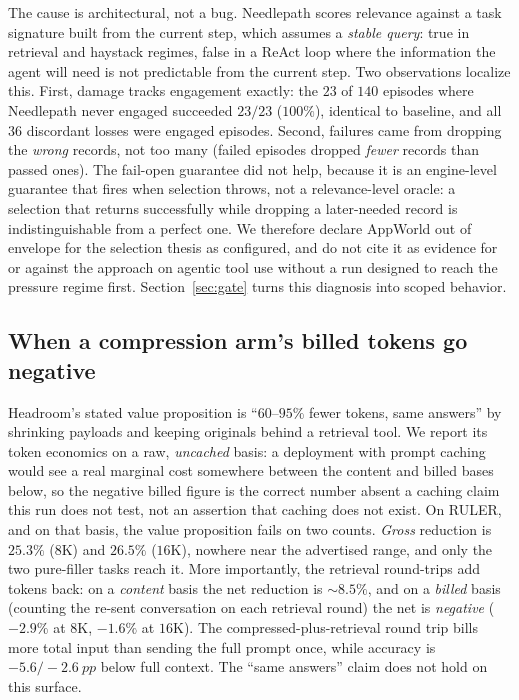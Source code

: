 \documentclass[11pt]{article}
\newcommand{\pp}{~pp}          %
\newcommand{\NP}{Needlepath}
\begin{document}
The cause is architectural, not a bug. \NP{} scores relevance against a task signature built from
the current step, which assumes a \emph{stable query}: true in retrieval and haystack regimes,
false in a ReAct loop where the information the agent will need is not predictable from the current
step. Two observations localize this. First, damage tracks engagement exactly: the $23$ of $140$
episodes where \NP{} never engaged succeeded $23/23$ ($100\%$), identical to baseline, and all $36$
discordant losses were engaged episodes. Second, failures came from dropping the \emph{wrong}
records, not too many (failed episodes dropped \emph{fewer} records than passed ones). The
fail-open guarantee did not help, because it is an engine-level guarantee that fires when
selection throws, not a relevance-level oracle: a selection that returns successfully while
dropping a later-needed record is indistinguishable from a perfect one. We therefore declare
AppWorld out of envelope for the selection thesis as configured, and do not cite it as evidence
for or against the approach on agentic tool use without a run designed to reach the pressure
regime first. Section~\ref{sec:gate} turns this diagnosis into scoped behavior.

\subsection{When a compression arm's billed tokens go negative}
\label{sec:headroom-negative}

Headroom's stated value proposition is ``$60$--$95\%$ fewer tokens, same answers'' by shrinking
payloads and keeping originals behind a retrieval tool. We report its token economics on a raw,
\emph{uncached} basis: a deployment with prompt caching would see a real marginal cost somewhere
between the content and billed bases below, so the negative billed figure is the correct number
absent a caching claim this run does not test, not an assertion that caching does not exist. On
RULER, and on that basis, the value proposition fails on two counts. \emph{Gross} reduction is
$25.3\%$ ($8$K) and $26.5\%$ ($16$K), nowhere near the advertised range, and only the two
pure-filler tasks reach it. More importantly, the retrieval round-trips add tokens back: on a
\emph{content} basis the net reduction is ${\sim}8.5\%$, and on a \emph{billed} basis (counting
the re-sent conversation on each retrieval round) the net is \emph{negative} ($-2.9\%$ at $8$K,
$-1.6\%$ at $16$K). The compressed-plus-retrieval round trip bills more total input than sending
the full prompt once, while accuracy is $-5.6/-2.6\pp$ below full context. The ``same answers''
claim does not hold on this surface.
\end{document}
